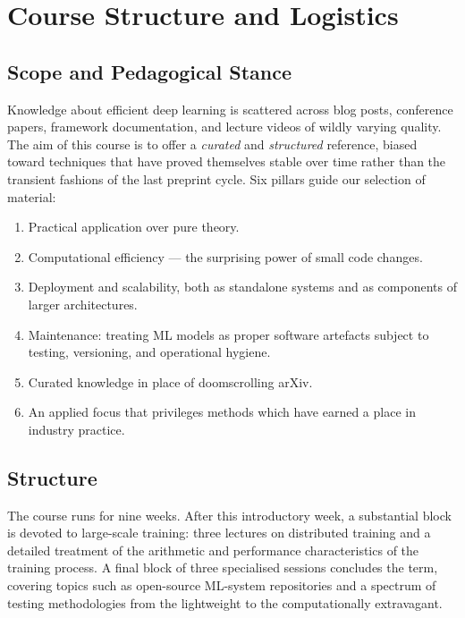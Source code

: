\documentclass[11pt,a4paper]{article}
\theoremstyle{definition}
\theoremstyle{remark}
\theoremstyle{plain}
\begin{document}
\section{Course Structure and Logistics}

\subsection{Scope and Pedagogical Stance}

Knowledge about efficient deep learning is scattered across blog
posts, conference papers, framework documentation, and lecture videos
of wildly varying quality. The aim of this course is to offer a
\emph{curated} and \emph{structured} reference, biased toward
techniques that have proved themselves stable over time rather than
the transient fashions of the last preprint cycle. Six pillars guide
our selection of material:

\begin{enumerate}[leftmargin=1.8em, itemsep=2pt]
    \item Practical application over pure theory.
    \item Computational efficiency --- the surprising power of small
          code changes.
    \item Deployment and scalability, both as standalone systems and
          as components of larger architectures.
    \item Maintenance: treating ML models as proper software
          artefacts subject to testing, versioning, and operational
          hygiene.
    \item Curated knowledge in place of doomscrolling arXiv.
    \item An applied focus that privileges methods which have earned
          a place in industry practice.
\end{enumerate}

\subsection{Structure}

The course runs for nine weeks. After this introductory week, a
substantial block is devoted to large-scale training: three lectures
on distributed training and a detailed treatment of the arithmetic
and performance characteristics of the training process. A final
block of three specialised sessions concludes the term, covering
topics such as open-source ML-system repositories and a spectrum of
testing methodologies from the lightweight to the computationally
extravagant.
\end{document}
